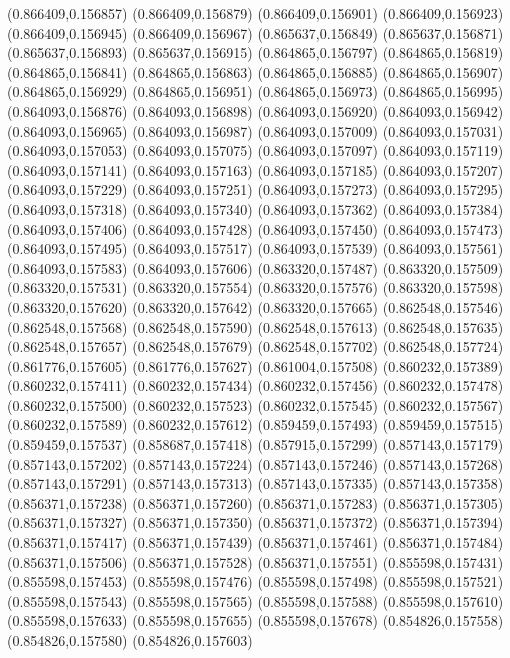 (0.866409,0.156857)
(0.866409,0.156879)
(0.866409,0.156901)
(0.866409,0.156923)
(0.866409,0.156945)
(0.866409,0.156967)
(0.865637,0.156849)
(0.865637,0.156871)
(0.865637,0.156893)
(0.865637,0.156915)
(0.864865,0.156797)
(0.864865,0.156819)
(0.864865,0.156841)
(0.864865,0.156863)
(0.864865,0.156885)
(0.864865,0.156907)
(0.864865,0.156929)
(0.864865,0.156951)
(0.864865,0.156973)
(0.864865,0.156995)
(0.864093,0.156876)
(0.864093,0.156898)
(0.864093,0.156920)
(0.864093,0.156942)
(0.864093,0.156965)
(0.864093,0.156987)
(0.864093,0.157009)
(0.864093,0.157031)
(0.864093,0.157053)
(0.864093,0.157075)
(0.864093,0.157097)
(0.864093,0.157119)
(0.864093,0.157141)
(0.864093,0.157163)
(0.864093,0.157185)
(0.864093,0.157207)
(0.864093,0.157229)
(0.864093,0.157251)
(0.864093,0.157273)
(0.864093,0.157295)
(0.864093,0.157318)
(0.864093,0.157340)
(0.864093,0.157362)
(0.864093,0.157384)
(0.864093,0.157406)
(0.864093,0.157428)
(0.864093,0.157450)
(0.864093,0.157473)
(0.864093,0.157495)
(0.864093,0.157517)
(0.864093,0.157539)
(0.864093,0.157561)
(0.864093,0.157583)
(0.864093,0.157606)
(0.863320,0.157487)
(0.863320,0.157509)
(0.863320,0.157531)
(0.863320,0.157554)
(0.863320,0.157576)
(0.863320,0.157598)
(0.863320,0.157620)
(0.863320,0.157642)
(0.863320,0.157665)
(0.862548,0.157546)
(0.862548,0.157568)
(0.862548,0.157590)
(0.862548,0.157613)
(0.862548,0.157635)
(0.862548,0.157657)
(0.862548,0.157679)
(0.862548,0.157702)
(0.862548,0.157724)
(0.861776,0.157605)
(0.861776,0.157627)
(0.861004,0.157508)
(0.860232,0.157389)
(0.860232,0.157411)
(0.860232,0.157434)
(0.860232,0.157456)
(0.860232,0.157478)
(0.860232,0.157500)
(0.860232,0.157523)
(0.860232,0.157545)
(0.860232,0.157567)
(0.860232,0.157589)
(0.860232,0.157612)
(0.859459,0.157493)
(0.859459,0.157515)
(0.859459,0.157537)
(0.858687,0.157418)
(0.857915,0.157299)
(0.857143,0.157179)
(0.857143,0.157202)
(0.857143,0.157224)
(0.857143,0.157246)
(0.857143,0.157268)
(0.857143,0.157291)
(0.857143,0.157313)
(0.857143,0.157335)
(0.857143,0.157358)
(0.856371,0.157238)
(0.856371,0.157260)
(0.856371,0.157283)
(0.856371,0.157305)
(0.856371,0.157327)
(0.856371,0.157350)
(0.856371,0.157372)
(0.856371,0.157394)
(0.856371,0.157417)
(0.856371,0.157439)
(0.856371,0.157461)
(0.856371,0.157484)
(0.856371,0.157506)
(0.856371,0.157528)
(0.856371,0.157551)
(0.855598,0.157431)
(0.855598,0.157453)
(0.855598,0.157476)
(0.855598,0.157498)
(0.855598,0.157521)
(0.855598,0.157543)
(0.855598,0.157565)
(0.855598,0.157588)
(0.855598,0.157610)
(0.855598,0.157633)
(0.855598,0.157655)
(0.855598,0.157678)
(0.854826,0.157558)
(0.854826,0.157580)
(0.854826,0.157603)

